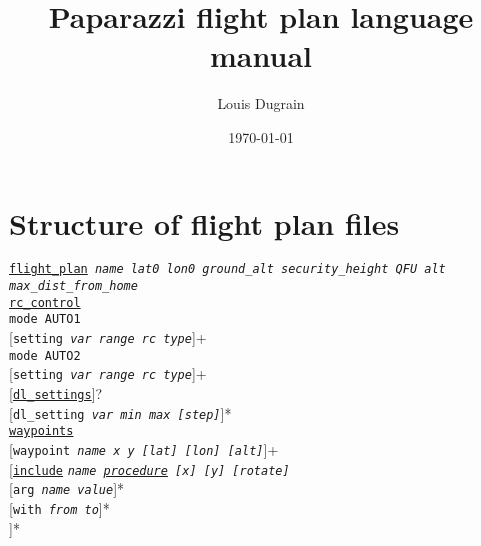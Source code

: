 \documentclass{article}
\title{Paparazzi flight plan language manual}
\author{Louis Dugrain}
\date{\today}
\renewcommand{\tt}[1]{\texttt{#1}}
\newcommand{\hs}[1]{\hspace*{#1cm}}
\begin{document}
\maketitle


\hypertarget{flightplanstructure}{\section{Structure of flight plan files}}

\begin{minipage}[ctb]{\textwidth}
\tt{\hyperlink{generaldata}{flight\_plan} \emph{name lat0 lon0 ground\_alt security\_height QFU alt max\_dist\_from\_home}} \\
	\hs{0.5} \hyperlink{rccontrol}{\tt{rc\_control}} \\
		\hs{1} \tt{mode AUTO1} \\
			\hs{1.5} [\tt{setting \emph{var range rc type}}]+ \\
		\hs{1} \tt{mode AUTO2} \\
			\hs{1.5} [\tt{setting \emph{var range rc type}}]+ \\
			
	\hs{0.5} [\hyperlink{dlsettings}{\tt{dl\_settings}}]? \\
		\hs{1} [\tt{dl\_setting \emph{var min max [step]}}]* \\
		
	\hs{0.5} \hyperlink{waypoints}{\tt{waypoints}} \\
		\hs{1} [\tt{waypoint \emph{name x y [lat] [lon] [alt]}}]+ \\
		
	\hs{0.5} [\hyperlink{include}{\tt{include}} \tt{\emph{name \hyperlink{procedures}{procedure} [x] [y] [rotate]}} \\
		\hs{1} [\tt{arg \emph{name value}}]* \\
		\hs{1} [\tt{with \emph{from to}}]* \\
	\hs{0.5} ]* \\
	

\end{minipage}
\end{document}
